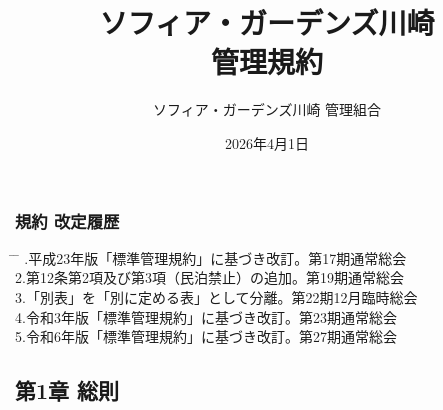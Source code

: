 \documentclass[
  luatex,
  paper=a4paper,
  fontsize=11pt,
  jafontsize=11pt,
  jlreq_notes,
]{jlreq}
\renewcommand{\baselinestretch}{0.9}
\begin{document}
  \pagestyle{empty} %
  \title{ソフィア・ガーデンズ川崎\\管理規約}
  \date{2026年4月1日}
  \maketitle
  \thispagestyle{empty}
  \vfill      %

  \begin{center}
    \vspace*{3\baselineskip}
    \author{\Large ソフィア・ガーデンズ川崎 管理組合}
  \end{center}
  \vspace*{2\baselineskip}
  { \renewcommand{\baselinestretch}{0.8}\selectfont   %
    \subsubsection*{ 規約 改定履歴 }
    \small
    \vspace*{1\baselineskip}
    \begin{tabbing}
      \hspace{5mm} \= \hspace{90mm} \= \hspace{100mm} .\>平成23年版「標準管理規約」に基づき改訂。\>第17期通常総会\\
      2.\>第12条第2項及び第3項（民泊禁止）の追加。\>第19期通常総会\\
      3.\>「別表」を「別に定める表」として分離。\>第22期12月臨時総会\\
      4.\>令和3年版「標準管理規約」に基づき改訂。\>第23期通常総会\\
      5.\>令和6年版「標準管理規約」に基づき改訂。\>第27期通常総会\\
    \end{tabbing}
  }
  \clearpage

  { \renewcommand{\baselinestretch}{0.8}\selectfont
    \tableofcontents        %
  }
  \clearpage

  \setcounter{page}{1}    %
  \pagestyle{plain}       %

  \begin{center}
    \subsection*{第1章 総則}
  \end{center}
\end{document}
